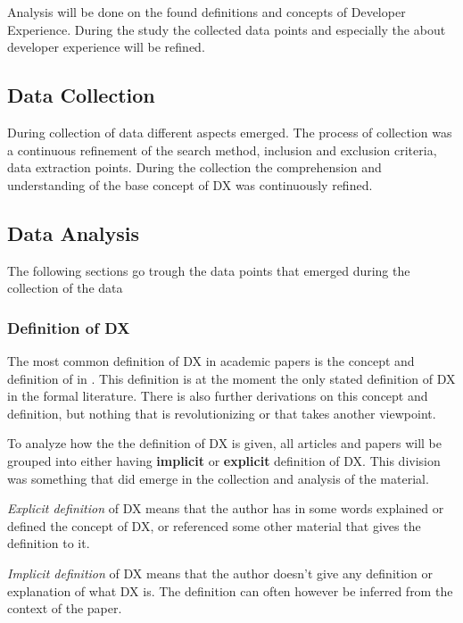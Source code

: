 \documentclass[english, 12pt, a4paper, sci, utf8, a-1b, online]{aaltothesis}
\begin{document}
Analysis will be done on the found definitions and concepts of Developer Experience. During the study the collected data points and especially the about developer experience will be refined.

\subsection{Data Collection}

During collection of data different aspects emerged. The process of collection was a continuous refinement of the search method, inclusion and exclusion criteria, data extraction points. During the collection the comprehension and understanding of the base concept of DX was continuously refined.

\subsection{Data Analysis}

The following sections go trough the data points that emerged during the collection of the data

\subsubsection{Definition of DX}

The most common definition of DX in academic papers is the concept and definition of in  \cite{fagerholm-dx-concept-and-definition}. This definition is at the moment the only stated definition of DX in the formal literature. There is also further derivations on this concept and definition, but nothing that is revolutionizing or that takes another viewpoint.

To analyze how the the definition of DX is given, all articles and papers will be grouped into either having \textbf{implicit} or \textbf{explicit} definition of DX. This division was something that did emerge in the collection and analysis of the material.

\textit{Explicit definition} of DX means that the author has in some words explained or defined the concept of DX, or referenced some other material that gives the definition to it.

\textit{Implicit definition} of DX means that the author doesn't give any definition or explanation of what DX is. The definition can often however be inferred from the context of the paper.
\end{document}
